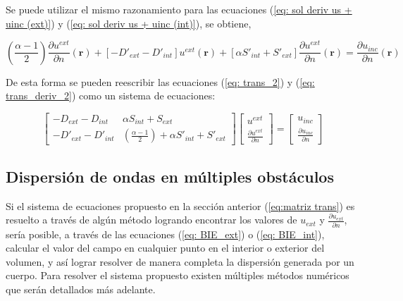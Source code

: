 \documentclass[12pt,letterpaper]{article}
\numberwithin{equation}{section}
\begin{document}
Se puede utilizar el mismo razonamiento para las ecuaciones (\ref{eq: sol deriv us + uinc (ext)}) y (\ref{eq: sol deriv us + uinc (int)}), se obtiene,

\begin{equation}
(\frac{\alpha - 1}{2})\frac{\partial u^{ext}}{\partial n}(\textbf{r}) + \left[-D'_{ext} - D'_{int}\right] u^{ext}(\textbf{r}) + \left[\alpha S'_{int} + S'_{ext}\right]\frac{\partial u^{ext}}{\partial n}(\textbf{r}) = \frac{\partial u_{inc}}{\partial n}(\textbf{r}) 
\label{eq: trans_deriv_2}		
\end{equation}

De esta forma se pueden reescribir las ecuaciones (\ref{eq: trans_2}) y (\ref{eq: trans_deriv_2}) como un sistema de ecuaciones:

\begin{equation} 
\begin{bmatrix}
-D_{ext} - D_{int} & \alpha S_{int} + S_{ext}\\
-D'_{ext} - D'_{int} & (\frac{\alpha - 1}{2})+\alpha S'_{int} + S'_{ext}
\end{bmatrix}
\begin{bmatrix}
u^{ext}\\
\frac{\partial u^{ext}}{\partial n}
\end{bmatrix}
=
\begin{bmatrix}
u_{inc}\\
\frac{\partial u_{inc}}{\partial n}
\end{bmatrix}
\label{eq:matriz trans}		 
\end{equation} 

\pagebreak
\subsection{Dispersión de ondas en múltiples obstáculos}
Si el sistema de ecuaciones propuesto en la sección anterior (\ref{eq:matriz trans}) es resuelto a través de algún método logrando encontrar los valores de $u_{ext}$ y $\frac{\partial u_{ext}}{\partial n}$, sería posible, a través de las ecuaciones (\ref{eq: BIE_ext}) o (\ref{eq: BIE_int}), calcular el valor del campo en cualquier punto en el interior o exterior del volumen, y así lograr resolver de manera completa la dispersión generada por un cuerpo. Para resolver el sistema propuesto existen múltiples métodos numéricos que serán detallados más adelante.
\end{document}
